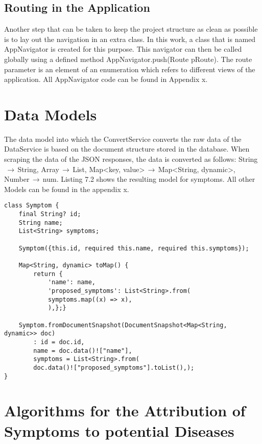 \subsection{Routing in the Application}
Another step that can be taken to keep the project structure as clean as possible is to lay out the navigation in an extra class. In this work, a class that is named AppNavigator is created for this purpose. This navigator can then be called globally using a defined method AppNavigator.push(Route pRoute). The route parameter is an element of an enumeration which refers to different views of the application. All AppNavigator code can be found in Appendix x.
\section{Data Models}
The data model into which the ConvertService converts the raw data of the DataService is based on the document structure stored in the database. When scraping the data of the JSON responses, the data is converted as follows: String$\,\to\,$String, Array$\,\to\,$List, Map<key, value>$\,\to\,$Map<String, dynamic>, Number$\,\to\,$num. Listing 7.2 shows the resulting model for symptoms. All other Models can be found in the appendix x.
\scriptsize
\begin{lstlisting}[caption=Model for Symptoms]
class Symptom {
	final String? id;
	String name;
	List<String> symptoms;
	
	Symptom({this.id, required this.name, required this.symptoms});
	
	Map<String, dynamic> toMap() {
		return {
			'name': name,
			'proposed_symptoms': List<String>.from(
			symptoms.map((x) => x),
			),};}
	
	Symptom.fromDocumentSnapshot(DocumentSnapshot<Map<String, dynamic>> doc)
		: id = doc.id,
		name = doc.data()!["name"],
		symptoms = List<String>.from(
		doc.data()!["proposed_symptoms"].toList(),);	
}
\end{lstlisting}
\normalsize


\section{Algorithms for the Attribution of Symptoms to potential Diseases}
